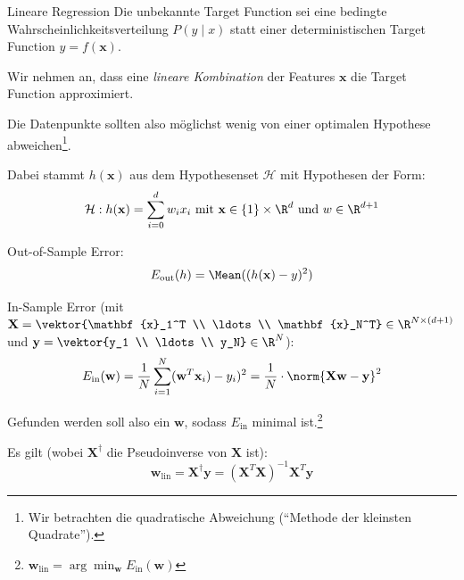 \begin{defi}{Lineare Regression}
    Die unbekannte Target Function sei eine bedingte Wahrscheinlichkeitsverteilung $P(y \mid x)$ statt einer deterministischen Target Function $y = f(\mathbf{x})$.

    Wir nehmen an, dass eine \emph{lineare Kombination} der Features $\mathbf{x}$ die Target Function approximiert.

    Die Datenpunkte sollten also möglichst wenig von einer optimalen Hypothese abweichen\footnote{Wir betrachten die quadratische Abweichung (\enquote{Methode der kleinsten Quadrate}).}.

    Dabei stammt $h(\mathbf{x})$ aus dem Hypothesenset $\mathcal{H}$ mit Hypothesen der Form:
    \[
        \mathcal{H}: h(\mathbf{x}) = \sum_{i=0}^d w_i x_i \ \text{mit} \ \mathbf{x} \in \{ 1 \} \times \R^d \ \text{und} \ w \in \R^{d+1}
    \]

    Out-of-Sample Error:
    \[
        E_\text{out}(h) = \Mean((h(\mathbf{x}) - y)^2)
    \]

    In-Sample Error (mit $\displaystyle \mathbf{X} = \vektor{\mathbf{x}_1^T \\ \ldots \\ \mathbf{x}_N^T} \in \R^{N\times (d+1)}$ und $\displaystyle \mathbf{y} = \vektor{y_1 \\ \ldots \\ y_N} \in \R^{N}$):
    \[
        E_\text{in}(\mathbf{w}) = \frac{1}{N} \sum_{i=1}^N ( \mathbf{w}^T \mathbf{x}_i) - y_i)^2 = \frac{1}{N} \cdot \norm{\mathbf{X} \mathbf{w} - \mathbf{y}}^2
    \]

    Gefunden werden soll also ein $\mathbf{w}$, sodass $E_\text{in}$ minimal ist.\footnote{$\mathbf{w}_\text{lin} = \arg\min_\mathbf{w} E_\text{in}(\mathbf{w})$}

    Es gilt (wobei $\mathbf{X}^\dagger$ die Pseudoinverse von $\mathbf{X}$ ist):
    \[
        \mathbf{w}_\text{lin} = \mathbf{X}^\dagger \mathbf{y} = (\mathbf{X}^T \mathbf{X})^{-1} \mathbf{X}^T \mathbf{y}
    \]
\end{defi}

